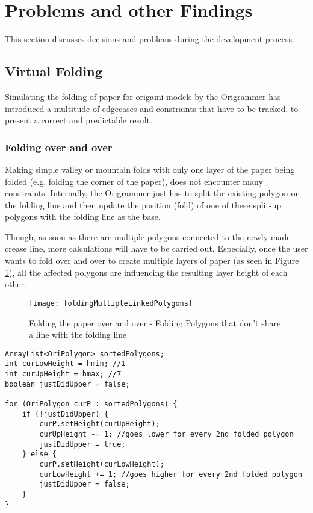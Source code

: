 
\section{Problems and other Findings}
\label{sec:problems}

This section discusses decisions and problems during the development process.


\subsection{Virtual Folding}

Simulating the folding of paper for origami models by the Origrammer has introduced a multitude of edgecases and constraints that have to be tracked, to present a correct and predictable result.

\subsubsection{Folding over and over}

Making simple valley or mountain folds with only one layer of the paper being folded (e.g. folding the corner of the paper), does not encounter many constraints. Internally, the Origrammer just has to split the existing polygon on the folding line and then update the position (fold) of one of these split-up polygons with the folding line as the base.

Though, as soon as there are multiple polygons connected to the newly made crease line, more calculations will have to be carried out. Especially, once the user wants to fold over and over to create multiple layers of paper (as seen in Figure \ref{fig:foldingMultipleLinkedPolygons}), all the affected polygons are influencing the resulting layer height of each other.
\begin{figure}[htbp]
	\centering
	\texttt{[image: foldingMultipleLinkedPolygons]}
	\caption{Folding the paper over and over - Folding Polygons that don't share a line with the folding line}
	\label{fig:foldingMultipleLinkedPolygons}
\end{figure}

\begin{lstlisting}[label=sortPolygons,caption=OriPolygon]
ArrayList<OriPolygon> sortedPolygons;
int curLowHeight = hmin; //1
int curUpHeight = hmax; //7
boolean justDidUpper = false;

for (OriPolygon curP : sortedPolygons) {
    if (!justDidUpper) {
        curP.setHeight(curUpHeight);
        curUpHeight -= 1; //goes lower for every 2nd folded polygon
        justDidUpper = true;
    } else {
        curP.setHeight(curLowHeight);
        curLowHeight += 1; //goes higher for every 2nd folded polygon
        justDidUpper = false;
    }
}
\end{lstlisting}




